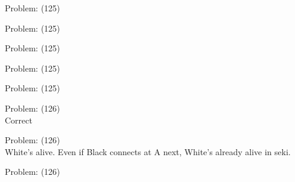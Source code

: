 \documentclass[11pt]{article}
\begin{document}
\begin{minipage}[t]{0.5\textwidth}
  {\centering
  
Problem: (125)\\
  }
\end{minipage}
\begin{minipage}[t]{0.5\textwidth}
  {\centering
  
Problem: (125)\\
  }
\end{minipage}
\begin{minipage}[t]{0.5\textwidth}
  {\centering
  
Problem: (125)\\
  }
\end{minipage}
\begin{minipage}[t]{0.5\textwidth}
  {\centering
  
Problem: (125)\\
  }
\end{minipage}
\begin{minipage}[t]{0.5\textwidth}
  {\centering
  
Problem: (125)\\
  }
\end{minipage}
\begin{minipage}[t]{0.5\textwidth}
  {\centering
  
Problem: (126)\\
Correct\\
  }
\end{minipage}
\begin{minipage}[t]{0.5\textwidth}
  {\centering
  
Problem: (126)\\
White's alive. Even if Black connects at A next, White's already alive in seki.\\
  }
\end{minipage}
\begin{minipage}[t]{0.5\textwidth}
  {\centering
  
Problem: (126)\\
  }
\end{minipage}
\end{document}
